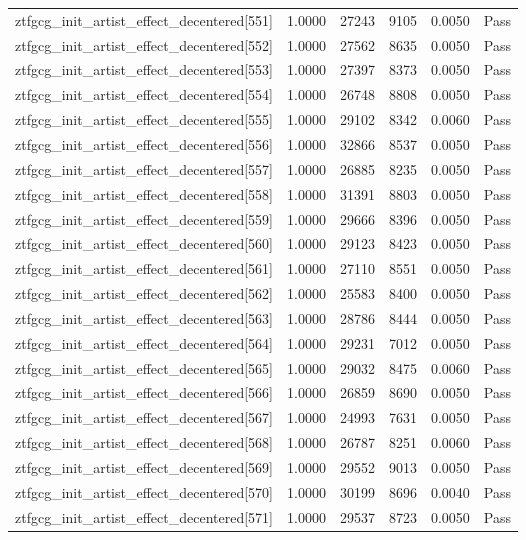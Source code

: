 \begin{table}[htbp]
\begin{tabular}{llrrll}
ztfgcg\_init\_artist\_effect\_decentered[551] & 1.0000 & 27243 & 9105 & 0.0050 & Pass \\
ztfgcg\_init\_artist\_effect\_decentered[552] & 1.0000 & 27562 & 8635 & 0.0050 & Pass \\
ztfgcg\_init\_artist\_effect\_decentered[553] & 1.0000 & 27397 & 8373 & 0.0050 & Pass \\
ztfgcg\_init\_artist\_effect\_decentered[554] & 1.0000 & 26748 & 8808 & 0.0050 & Pass \\
ztfgcg\_init\_artist\_effect\_decentered[555] & 1.0000 & 29102 & 8342 & 0.0060 & Pass \\
ztfgcg\_init\_artist\_effect\_decentered[556] & 1.0000 & 32866 & 8537 & 0.0050 & Pass \\
ztfgcg\_init\_artist\_effect\_decentered[557] & 1.0000 & 26885 & 8235 & 0.0050 & Pass \\
ztfgcg\_init\_artist\_effect\_decentered[558] & 1.0000 & 31391 & 8803 & 0.0050 & Pass \\
ztfgcg\_init\_artist\_effect\_decentered[559] & 1.0000 & 29666 & 8396 & 0.0050 & Pass \\
ztfgcg\_init\_artist\_effect\_decentered[560] & 1.0000 & 29123 & 8423 & 0.0050 & Pass \\
ztfgcg\_init\_artist\_effect\_decentered[561] & 1.0000 & 27110 & 8551 & 0.0050 & Pass \\
ztfgcg\_init\_artist\_effect\_decentered[562] & 1.0000 & 25583 & 8400 & 0.0050 & Pass \\
ztfgcg\_init\_artist\_effect\_decentered[563] & 1.0000 & 28786 & 8444 & 0.0050 & Pass \\
ztfgcg\_init\_artist\_effect\_decentered[564] & 1.0000 & 29231 & 7012 & 0.0050 & Pass \\
ztfgcg\_init\_artist\_effect\_decentered[565] & 1.0000 & 29032 & 8475 & 0.0060 & Pass \\
ztfgcg\_init\_artist\_effect\_decentered[566] & 1.0000 & 26859 & 8690 & 0.0050 & Pass \\
ztfgcg\_init\_artist\_effect\_decentered[567] & 1.0000 & 24993 & 7631 & 0.0050 & Pass \\
ztfgcg\_init\_artist\_effect\_decentered[568] & 1.0000 & 26787 & 8251 & 0.0060 & Pass \\
ztfgcg\_init\_artist\_effect\_decentered[569] & 1.0000 & 29552 & 9013 & 0.0050 & Pass \\
ztfgcg\_init\_artist\_effect\_decentered[570] & 1.0000 & 30199 & 8696 & 0.0040 & Pass \\
ztfgcg\_init\_artist\_effect\_decentered[571] & 1.0000 & 29537 & 8723 & 0.0050 & Pass \\

\end{tabular}
\end{table}
